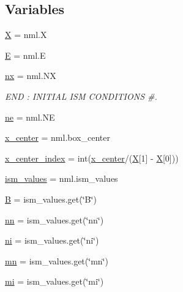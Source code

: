 \subsection*{Variables}
\begin{DoxyCompactItemize}
\item 
\hyperlink{namespacesetup__advst_a4fe22219bfc7363b6decb33a0885e17a}{X} = nml.\+X
\item 
\hyperlink{namespacesetup__advst_a846b33b3abeae0f60876a6d51bb0ae79}{E} = nml.\+E
\item 
\hyperlink{namespacesetup__advst_aa44e46a3cb0daf29ee1a32f36639c05e}{nx} = nml.\+NX
\begin{DoxyCompactList}\small\item\em E\+ND \+: I\+N\+I\+T\+I\+AL I\+SM C\+O\+N\+D\+I\+T\+I\+O\+NS \#. \end{DoxyCompactList}\item 
\hyperlink{namespacesetup__advst_a8f95ce201bbfb29f5a8917506e0830e3}{ne} = nml.\+NE
\item 
\hyperlink{namespacesetup__advst_a2c4f0bfb8958db00072a21d605c3d35d}{x\+\_\+center} = nml.\+box\+\_\+center
\item 
\hyperlink{namespacesetup__advst_a2d2df5db7a3292eb8a74abab9e31bf7b}{x\+\_\+center\+\_\+index} = int(\hyperlink{namespacesetup__advst_a2c4f0bfb8958db00072a21d605c3d35d}{x\+\_\+center}/(\hyperlink{namespacesetup__advst_a4fe22219bfc7363b6decb33a0885e17a}{X}\mbox{[}1\mbox{]} -\/ \hyperlink{namespacesetup__advst_a4fe22219bfc7363b6decb33a0885e17a}{X}\mbox{[}0\mbox{]}))
\item 
\hyperlink{namespacesetup__advst_a2c8aac5411f119328f0fc506a3ed8498}{ism\+\_\+values} = nml.\+ism\+\_\+values
\item 
\hyperlink{namespacesetup__advst_ac57ac3969c7f3e561eb210c0c6801240}{B} = ism\+\_\+values.\+get(\char`\"{}B\char`\"{})
\item 
\hyperlink{namespacesetup__advst_aa01e87b98f1e1cf049cf5a7d8c210d3a}{nn} = ism\+\_\+values.\+get(\char`\"{}nn\char`\"{})
\item 
\hyperlink{namespacesetup__advst_a462de59237efc140e6463a9180c7c9d5}{ni} = ism\+\_\+values.\+get(\char`\"{}ni\char`\"{})
\item 
\hyperlink{namespacesetup__advst_a86a255a04ac9cb76649f6926808b8f39}{mn} = ism\+\_\+values.\+get(\char`\"{}mn\char`\"{})
\item 
\hyperlink{namespacesetup__advst_ac7afd5680fa2723246cba3b6815e77cf}{mi} = ism\+\_\+values.\+get(\char`\"{}mi\char`\"{})
\item 

\end{DoxyCompactItemize}
